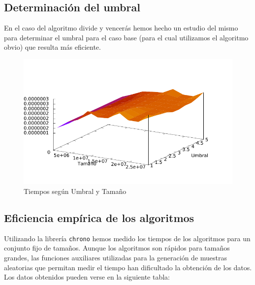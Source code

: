 \subsection{Determinación del umbral}

En el caso del algoritmo divide y vencerás hemos hecho un estudio del mismo para determinar el umbral para el caso base (para el cual utilizamos el algoritmo obvio) que resulta más eficiente.


\begin{figure}[H]\includegraphics[width=13cm]{img/umbral_posicion.pdf} \centering
	\caption{Tiempos según Umbral y Tamaño}\end{figure}

\subsection{Eficiencia empírica de los algoritmos}

Utilizando la librería \texttt{chrono} hemos medido los tiempos de los algoritmos para un conjunto fijo de tamaños. Aunque los algoritmos son rápidos para tamaños grandes, las funciones auxiliares utilizadas para la generación de muestras aleatorias que permitan medir el tiempo han dificultado la obtención de los datos. Los datos obtenidos pueden verse en la siguiente tabla:


\vspace*{1cm}

\posObvio
{}\posDyV
{} {\posObvio}

